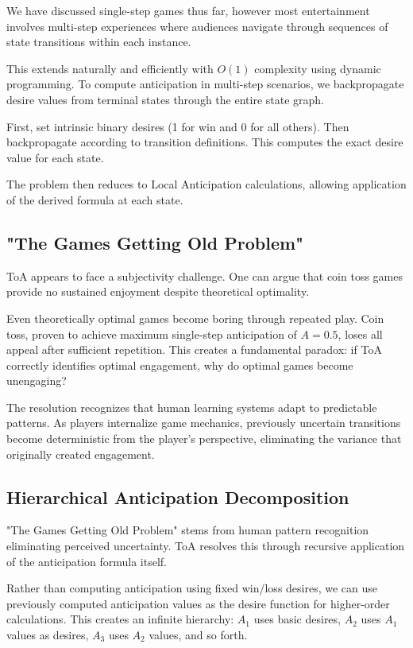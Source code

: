 \documentclass{article}
\begin{document}
We have discussed single-step games thus far, however most entertainment involves multi-step experiences where audiences navigate through sequences of state transitions within each instance.

This extends naturally and efficiently with $O(1)$ complexity using dynamic programming. To compute anticipation in multi-step scenarios, we backpropagate desire values from terminal states through the entire state graph.

First, set intrinsic binary desires (1 for win and 0 for all others). Then backpropagate according to transition definitions. This computes the exact desire value for each state.

The problem then reduces to Local Anticipation calculations, allowing application of the derived formula at each state.

\subsection{"The Games Getting Old Problem"}

ToA appears to face a subjectivity challenge. One can argue that coin toss games provide no sustained enjoyment despite theoretical optimality.

Even theoretically optimal games become boring through repeated play. Coin toss, proven to achieve maximum single-step anticipation of $A = 0.5$, loses all appeal after sufficient repetition. This creates a fundamental paradox: if ToA correctly identifies optimal engagement, why do optimal games become unengaging?

The resolution recognizes that human learning systems adapt to predictable patterns. As players internalize game mechanics, previously uncertain transitions become deterministic from the player's perspective, eliminating the variance that originally created engagement.

\subsection{Hierarchical Anticipation Decomposition}

"The Games Getting Old Problem" stems from human pattern recognition eliminating perceived uncertainty. ToA resolves this through recursive application of the anticipation formula itself.

Rather than computing anticipation using fixed win/loss desires, we can use previously computed anticipation values as the desire function for higher-order calculations. This creates an infinite hierarchy: $A_1$ uses basic desires, $A_2$ uses $A_1$ values as desires, $A_3$ uses $A_2$ values, and so forth.
\end{document}
